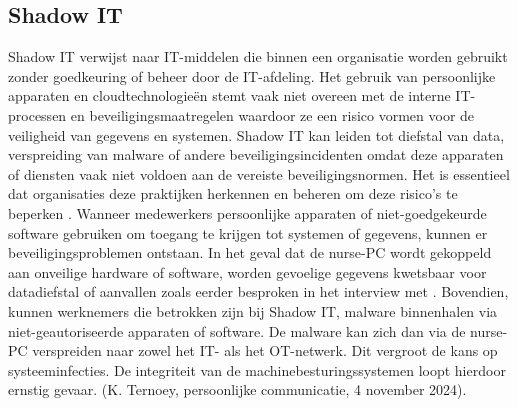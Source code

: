 \subsection{Shadow IT}
Shadow IT verwijst naar IT-middelen die binnen een organisatie worden gebruikt zonder goedkeuring of beheer door de IT-afdeling.
Het gebruik van persoonlijke apparaten en cloudtechnologieën stemt vaak niet overeen met de interne IT-processen en beveiligingsmaatregelen waardoor ze een 
risico vormen voor de veiligheid van gegevens en systemen. Shadow IT kan leiden tot diefstal van data, 
verspreiding van malware of andere beveiligingsincidenten omdat deze apparaten of diensten vaak niet voldoen aan de vereiste beveiligingsnormen. 
Het is essentieel dat organisaties deze praktijken herkennen en beheren om deze risico’s te beperken \autocite{NCSC2023}.
Wanneer medewerkers persoonlijke apparaten of niet-goedgekeurde software gebruiken om toegang te krijgen tot systemen of gegevens, kunnen er beveiligingsproblemen 
ontstaan. In het geval dat de nurse-PC wordt gekoppeld aan onveilige hardware of software, worden gevoelige gegevens kwetsbaar voor 
datadiefstal of aanvallen zoals eerder besproken in het interview met \textcite{Hecker2021}.
Bovendien, kunnen werknemers die betrokken zijn bij Shadow IT, malware binnenhalen via niet-geautoriseerde apparaten of software. 
De malware kan zich dan via de nurse-PC verspreiden naar zowel het IT- als het OT-netwerk. 
Dit vergroot de kans op systeeminfecties. De integriteit van de machinebesturingssystemen loopt hierdoor ernstig gevaar. (K. Ternoey, persoonlijke communicatie, 4 november 2024).



